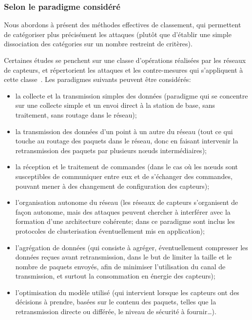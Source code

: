     \subsubsection{Selon le paradigme considéré}\label{ea:sss:paradigm}
Nous abordons à présent des méthodes effectives de classement, qui permettent de catégoriser plus précisément les attaques (plutôt que d'établir une simple dissociation des catégories sur un nombre restreint de critères).

Certaines études se penchent sur une classe d'opérations réalisées par les réseaux de capteurs, et répertorient les attaques et les contre-mesures qui s'appliquent à cette classe~\cite{JPD06,OX09}.
Les paradigmes suivants peuvent être considérés:
\begin{itemize}
    \item la collecte et la transmission simples des données (paradigme qui se concentre sur une collecte simple et un envoi direct à la station de base, sans traitement, sans routage dans le réseau);
    \item la transmission des données d'un point à un autre du réseau (\cad tout ce qui touche au routage des paquets dans le réseau, donc en faisant intervenir la retransmission des paquets par plusieurs nœuds intermédiaires);
    \item la réception et le traitement de commandes (dans le cas où les nœuds sont susceptibles de communiquer entre eux et de s'échanger des commandes, pouvant mener à des changement de configuration des capteurs);
    \item l'organisation autonome du réseau (les réseaux de capteurs s'organisent de façon autonome, mais des attaques peuvent chercher à interférer avec la formation d'une architecture cohérente; dans ce paradigme sont inclus les protocoles de clusterisation éventuellement mis en application);
    \item l'agrégation de données (qui consiste à agréger, éventuellement compresser les données reçues avant retransmission, dans le but de limiter la taille et le nombre de paquets envoyés, afin de minimiser l'utilisation du canal de transmission, et surtout la consommation en énergie des capteurs);
    \item l'optimisation du modèle utilisé (qui intervient lorsque les capteurs ont des décisions à prendre, basées sur le contenu des paquets, telles que la retransmission directe ou différée, le niveau de sécurité à fournir\dots).
\end{itemize}

